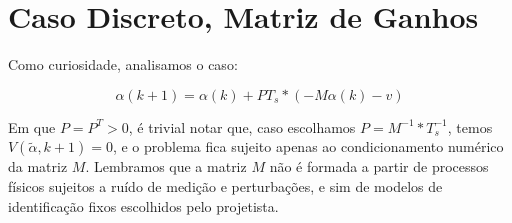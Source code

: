 \documentclass[11pt]{report}
\begin{document}
\section{Caso Discreto, Matriz de Ganhos}

Como curiosidade, analisamos o caso:

\begin{equation}
\alpha(k+1) = \alpha(k) + P T_s*(-M \alpha(k) - v)
\end{equation}

Em que $P=P^T>0$, é trivial notar que, caso escolhamos $P = M^{-1}*T_s^{-1}$, temos $V(\tilde{\alpha}, k+1) = 0$, e o problema fica sujeito apenas ao condicionamento numérico da matriz $M$. Lembramos que a matriz $M$ não é formada a partir de processos físicos sujeitos a ruído de medição e perturbações, e sim de modelos de identificação fixos escolhidos pelo projetista.
\end{document}
